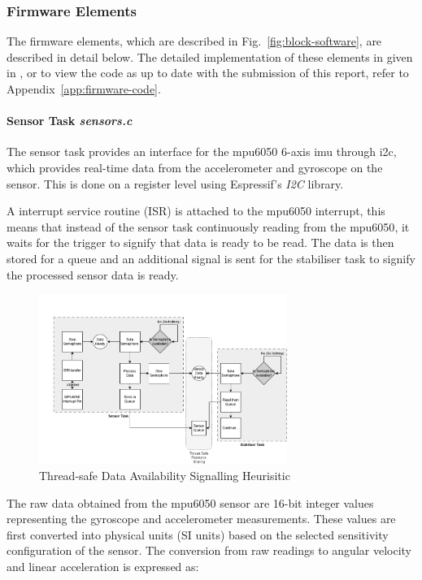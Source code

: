 \subsubsection{Firmware Elements}

The firmware elements, which are described in Fig.~\ref{fig:block-software}, are described in detail below. The detailed implementation of these elements in given in \cite{flightcontroller_git}, or to view the code as up to date with the submission of this report, refer to Appendix~\ref{app:firmware-code}.

\paragraph{\textbf{Sensor Task} \textit{sensors.c}} \leavevmode

The sensor task provides an interface for the \gls{mpu6050} 6-axis \gls{imu} through \gls{i2c}, which provides real-time data from the accelerometer and gyroscope on the sensor. This is done on a register level using Espressif's \textit{I2C} library.

A interrupt service routine (ISR) is attached to the \gls{mpu6050} interrupt, this means that instead of the sensor task continuously reading from the \gls{mpu6050}, it waits for the trigger to signify that data is ready to be read. The data is then stored for a queue and an additional signal is sent for the stabiliser task to signify the processed sensor data is ready.

\begin{figure}[H]
    \centering
    \captionsetup{justification=centering, margin=1cm}
    \includegraphics[width=0.72\textwidth]{img/sensor-semaphore.PNG}
    \caption{Thread-safe Data Availability Signalling Heurisitic}
    \label{fig:isr}
\end{figure}

The raw data obtained from the \gls{mpu6050} sensor are 16-bit integer values representing the gyroscope and accelerometer measurements. These values are first converted into physical units (SI units) based on the selected sensitivity configuration of the sensor. The conversion from raw readings to angular velocity and linear acceleration is expressed as:

